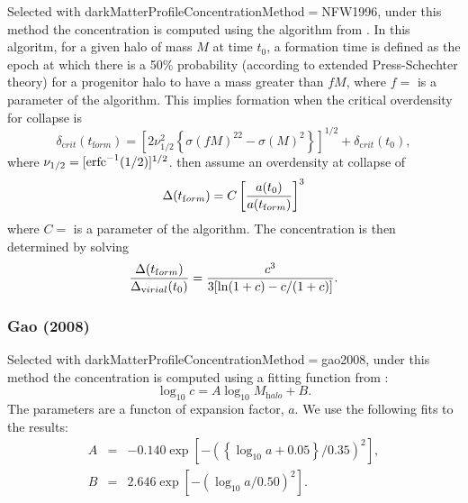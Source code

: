 Selected with {\normalfont \ttfamily darkMatterProfileConcentrationMethod}$=${\normalfont \ttfamily NFW1996}, under this method the concentration is computed using the algorithm from \cite{navarro_structure_1996}. In this algoritm, for a given halo of mass $M$ at time $t_0$, a formation time is defined as the epoch at which there is a 50\% probability (according to extended Press-Schechter theory) for a progenitor halo to have a mass greater than $fM$, where $f=${\normalfont {}} is a parameter of the algorithm. This implies formation when the critical overdensity for collapse is
\begin{equation}
 \delta_{\mathrm crit}(t_{\mathrm form}) = \left[ 2 \nu_{1/2}^2 \left\{\sigma(fM)^22-\sigma(M)^2\right\} \right]^{1/2}+\delta_{\mathrm crit}(t_0),
\end{equation}
where $\nu_{1/2} = [\hbox{erfc}^{-1}(1/2)]^{1/2}$. \cite{navarro_structure_1996} then assume an overdensity at collapse of 
\begin{equation}
 \Delta(t_{\mathrm form}) = C  \left[ {a(t_0) \over a(t_{\mathrm form})} \right]^3
\end{equation}
where $C=${\normalfont {}} is a parameter of the algorithm. The concentration is then determined by solving
\begin{equation}
 {\Delta(t_{\mathrm form}) \over \Delta_{\mathrm virial}(t_0)} = {c^3 \over 3 [\ln(1+c)-c/(1+c)]}.
\end{equation}

\subsubsection{Gao (2008)}\label{phys:darkMatterProfileConcentration:darkMatterProfileConcentrationGao2008}

Selected with {\normalfont \ttfamily darkMatterProfileConcentrationMethod}$=${\normalfont \ttfamily gao2008}, under this method the concentration is computed using a fitting function from \cite{gao_redshift_2008}:
\begin{equation}
\log_{10} c = A \log_{10} M_{\mathrm halo} + B.
\end{equation}
The parameters are a functon of expansion factor, $a$. We use the following fits to the \cite{gao_redshift_2008} results:
\begin{eqnarray}
A &=& -0.140 \exp\left[-\left(\left\{\log_{10}a+0.05\right\}/0.35\right)^2\right], \\
B &=&  2.646 \exp\left[-\left(\log_{10}a/0.50\right)^2\right].
\end{eqnarray}

